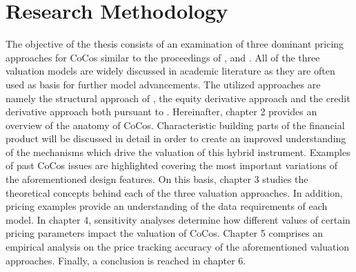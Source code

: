 \section{Research Methodology}
The objective of the thesis consists of an examination of three dominant pricing approaches for CoCos similar to the proceedings of \citet{alvemar2012modelling}, \citet{erismann2015pricing} and \citet{wilkens2014contingent}. All of the three valuation models are widely discussed in academic literature as they are often used as basis for further model advancements. The utilized approaches are namely the structural approach of \citet{pennacchi2010structural}, the equity derivative approach and the credit derivative approach both pursuant to \citet{de2011pricing}. Hereinafter, chapter 2 provides an overview of the anatomy of CoCos. Characteristic building parts of the financial product will be discussed in detail in order to create an improved understanding of the mechanisms which drive the valuation of this hybrid instrument. Examples of past CoCos issues are highlighted covering the most important variations of the aforementioned design features. On this basis, chapter 3 studies the theoretical concepts behind each of the three valuation approaches. In addition, pricing examples provide an understanding of the data requirements of each model. In chapter 4, sensitivity analyses determine how different values of certain pricing parameters impact the valuation of CoCos. Chapter 5 comprises an empirical analysis on the price tracking accuracy of the aforementioned valuation approaches. Finally, a conclusion is reached in chapter 6.




